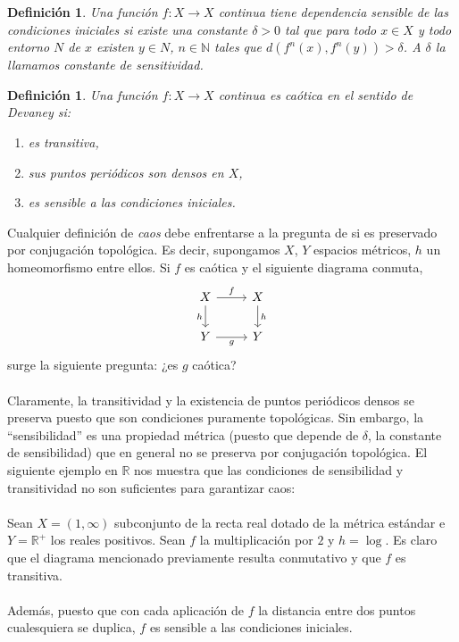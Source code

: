 \documentclass[12pt,a4paper]{article}
\newtheorem{definition}[theorem]{Definición}
\begin{document}
\begin{definition}
Una función $f: X \rightarrow X$ continua tiene dependencia sensible de las condiciones iniciales si existe una constante $\delta > 0$ tal que para todo $x \in X$ y todo entorno $N$ de $x$ existen $y \in N$, $n \in \mathbb{N}$ tales que $d(f^n(x), f^n(y)) > \delta$. A $\delta$ la llamamos constante de sensitividad.
\end{definition}
\begin{definition}
Una función $f: X \rightarrow X$ continua es caótica en el sentido de Devaney si:
\begin{enumerate}
    \item es transitiva,
    \item sus puntos periódicos son densos en $X$,
    \item es sensible a las condiciones iniciales.
\end{enumerate}
\end{definition}
Cualquier definición de \textit{caos} debe enfrentarse a la pregunta de si es preservado por conjugación topológica. Es decir, supongamos $X$, $Y$ espacios métricos, $h$ un homeomorfismo entre ellos.
Si $f$ es caótica y el siguiente diagrama conmuta,
\[
\begin{tikzcd}
X \arrow[r, "f"] \arrow[d, "h"'] & X \arrow[d, "h"] \\
Y \arrow[r, "g"'] & Y
\end{tikzcd}
\]
surge la siguiente pregunta: ¿es $g$ caótica?
\\
\\
Claramente, la transitividad y la existencia de puntos periódicos densos se preserva puesto que son condiciones puramente topológicas. Sin embargo, la ``sensibilidad'' es una propiedad métrica (puesto que depende de $\delta$, la constante de sensibilidad) que en general no se preserva por conjugación topológica. El siguiente ejemplo en $\mathbb{R}$ nos muestra que las condiciones de sensibilidad y transitividad no son suficientes para garantizar caos:
\\
\\
Sean $X = (1, \infty)$ subconjunto de la recta real dotado de la métrica estándar e $Y = \mathbb{R}^+$ los reales positivos. Sean $f$ la multiplicación por $2$ y $h = \operatorname{log}$. Es claro que el diagrama mencionado previamente resulta conmutativo y que $f$ es transitiva.
\\
\\
Además, puesto que con cada aplicación de $f$ la distancia entre dos puntos cualesquiera se duplica, $f$ es sensible a las condiciones iniciales.
\end{document}
